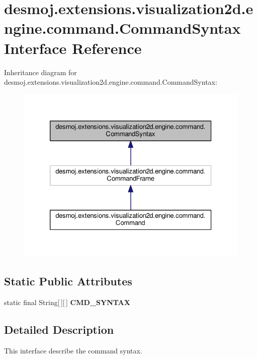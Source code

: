 \section{desmoj.\-extensions.\-visualization2d.\-engine.\-command.\-Command\-Syntax Interface Reference}
\label{interfacedesmoj_1_1extensions_1_1visualization2d_1_1engine_1_1command_1_1_command_syntax}


Inheritance diagram for desmoj.\-extensions.\-visualization2d.\-engine.\-command.\-Command\-Syntax\-:
\nopagebreak
\begin{figure}[H]
\begin{center}
\leavevmode
\includegraphics[width=326pt]{interfacedesmoj_1_1extensions_1_1visualization2d_1_1engine_1_1command_1_1_command_syntax__inherit__graph}
\end{center}
\end{figure}
\subsection*{Static Public Attributes}
\begin{DoxyCompactItemize}
\item 
static final String[$\,$][$\,$] {\bfseries C\-M\-D\-\_\-\-S\-Y\-N\-T\-A\-X}\label{interfacedesmoj_1_1extensions_1_1visualization2d_1_1engine_1_1command_1_1_command_syntax_ac82e4d4000dfccdbf5d896bbb7e255cb}

\end{DoxyCompactItemize}


\subsection{Detailed Description}
This interface describe the command syntax.

